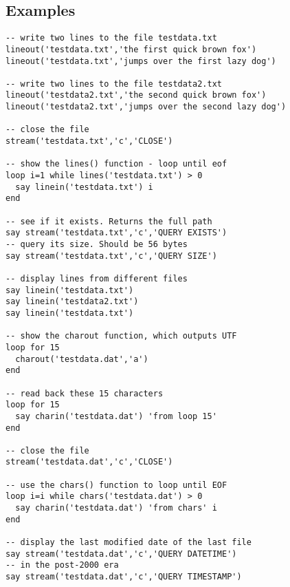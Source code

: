 \subsection{Examples}

\begin{lstlisting}[label=datessexample,caption=Example of using Date()]
-- write two lines to the file testdata.txt
lineout('testdata.txt','the first quick brown fox')
lineout('testdata.txt','jumps over the first lazy dog')

-- write two lines to the file testdata2.txt
lineout('testdata2.txt','the second quick brown fox')
lineout('testdata2.txt','jumps over the second lazy dog')

-- close the file
stream('testdata.txt','c','CLOSE')

-- show the lines() function - loop until eof
loop i=1 while lines('testdata.txt') > 0
  say linein('testdata.txt') i
end

-- see if it exists. Returns the full path
say stream('testdata.txt','c','QUERY EXISTS')
-- query its size. Should be 56 bytes
say stream('testdata.txt','c','QUERY SIZE')

-- display lines from different files 
say linein('testdata.txt')
say linein('testdata2.txt')
say linein('testdata.txt')

-- show the charout function, which outputs UTF
loop for 15
  charout('testdata.dat','a')
end

-- read back these 15 characters
loop for 15
  say charin('testdata.dat') 'from loop 15'
end

-- close the file
stream('testdata.dat','c','CLOSE')

-- use the chars() function to loop until EOF
loop i=i while chars('testdata.dat') > 0
  say charin('testdata.dat') 'from chars' i
end

-- display the last modified date of the last file
say stream('testdata.dat','c','QUERY DATETIME')
-- in the post-2000 era
say stream('testdata.dat','c','QUERY TIMESTAMP')

\end{lstlisting}
